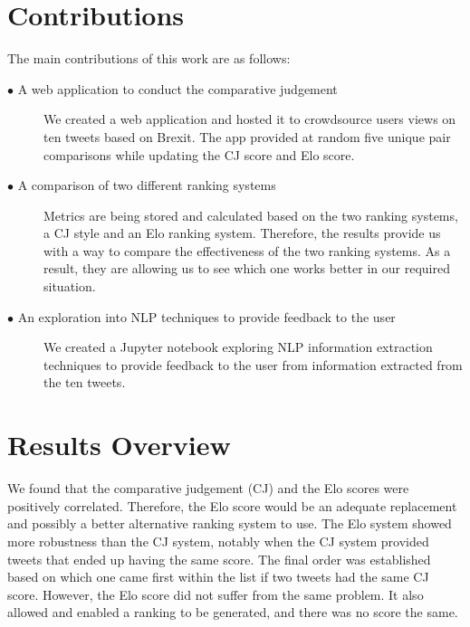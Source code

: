	\section{Contributions} 
		\label{sec:intro_contribs} 

		The main contributions of this work are as follows: %

		\begin{description}	

			\item[\(\bullet\) A web application to conduct the comparative judgement]\hfill

			We created a web application and hosted it to crowdsource users views on ten tweets based on Brexit. The app provided at random five unique pair comparisons while updating the CJ score and Elo score. 

			\item[\(\bullet\) A comparison of two different ranking systems]\hfill

			Metrics are being stored and calculated based on the two ranking systems, a CJ style and an Elo ranking system. Therefore, the results provide us with a way to compare the effectiveness of the two ranking systems. As a result, they are allowing us to see which one works better in our required situation.

			\item[\(\bullet\) An exploration into NLP techniques to provide feedback to the user]\hfill

		We created a Jupyter notebook exploring NLP information extraction techniques to provide feedback to the user from information extracted from the ten tweets.

		\end{description}
	
	\section{Results Overview}
		We found that the comparative judgement (CJ) and the Elo scores were positively correlated. Therefore, the Elo score would be an adequate replacement and possibly a better alternative ranking system to use. The Elo system showed more robustness than the CJ system, notably when the CJ system provided tweets that ended up having the same score. The final order was established based on which one came first within the list if two tweets had the same CJ score. However, the Elo score did not suffer from the same problem. It also allowed and enabled a ranking to be generated, and there was no score the same.
		
